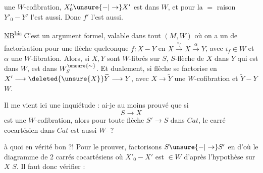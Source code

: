 
une $W$-cofibration, $X'_0\unsure{-|\to}X'$ est dans $W$, et pour la $=$ raison $Y'_0-Y'$ l'est aussi. Donc $f'$ l'est aussi.

\uline{NB}\textsuperscript{\uline{bis}} C'est un argument formel,  valable  dans tout $(M,W)$ où on a un  de factorisation pour une flèche quelconque $f:X-Y$ en $X\xrightarrow{i_f}\overline X\xrightarrow{\alpha}Y$, avec $i_f\in W$ et $\alpha$ une $W$-fibration. Alors, si $X,Y$ sont $W$-fibrés sur $S$,   $S$-flèche de $X$ dans $Y$ qui est dans $W$, est dans $W_S^{\unsure{\sim}}$. Et dualement, si  flèche  se factorise en $X'\longrightarrow\deleted{\unsure{X}}\widetilde Y\longrightarrow Y$, avec $X\longrightarrow\widetilde Y$ une $W$-cofibration et $\widetilde Y-Y$  $W$.

Il me vient ici une  inquiétude : ai-je au moins prouvé que si
\[
S\longrightarrow X
\]
est une $W$-cofibration, alors pour toute flèche $S'\longrightarrow S$ dans $Cat$, le carré cocartésien dans $Cat$
est aussi $W$-   ? 



à quoi en vérité  bon ?! Pour le prouver, factorisons  $S\unsure{-|\to}S'$ en
d'où le diagramme de 2 carrés cocartésiens
où $X'_0-X'$ est $\in W$ d'après l'hypothèse sur $X$  $S$. Il faut donc vérifier :

